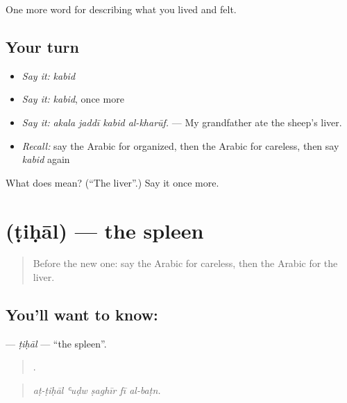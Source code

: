 \begin{grammarlens}[title={What you've built}]
One more word for describing what you lived and felt.
\end{grammarlens}

\subsection*{Your turn}
\begin{itemize}
\raggedright
  \item \emph{Say it:} \emph{kabid}
  \item \emph{Say it:} \emph{kabid}, once more
  \item \emph{Say it:} \emph{akala jaddī kabid al-kharūf.} — My grandfather ate the sheep's liver.
  \item \emph{Recall:} say the Arabic for organized, then the Arabic for careless, then say \emph{kabid} again
\end{itemize}

\begin{tcolorbox}[breakable,colback=teal!4,colframe=teal!35!black,title={Before you move on}]
What does  mean? (\textquotedblleft{}The liver\textquotedblright{}.) Say it once more.
\end{tcolorbox}
\section[\texorpdfstring{\ar{طحال} (ṭiḥāl)}{طحال (ṭiḥāl)}]{ (ṭiḥāl) — the spleen}

\label{lesson:AR-C504-tihal}



\begin{quote}
Before the new one: say the Arabic for careless, then the Arabic for the liver.
\end{quote}

\subsection*{You'll want to know: }
\textbf{} — \emph{ṭiḥāl} — \textquotedblleft{}the spleen\textquotedblright{}.

\begin{quote}
    .
\end{quote}

\begin{quote}
\emph{aṭ-ṭiḥāl ʿuḍw ṣaghīr fī al-baṭn.}
\end{quote}

